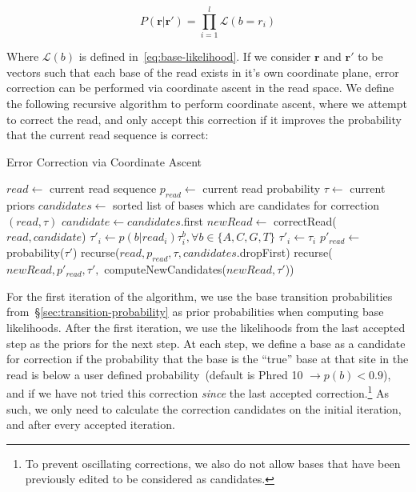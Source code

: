 \documentclass{llncs}
\begin{document}
\begin{equation}
\label{eq:read-probability}
P(\mathbf{r} | \mathbf{r}') = \prod_{i = 1}^l \mathcal{L}(b = r_i)
\end{equation}

Where $\mathcal{L}(b)$ is defined in~\eqref{eq:base-likelihood}. If we consider $\mathbf{r}$ and
$\mathbf{r}'$ to be vectors such that each base of the read exists in it's own coordinate plane, error
correction can be performed via coordinate ascent in the read space. We define the following recursive
algorithm to perform coordinate ascent, where we attempt to correct the read, and only accept this
correction if it improves the probability that the current read sequence is correct:

\begin{algorithm}
\caption{Error Correction via Coordinate Ascent}
\label{alg:ex-coordinate-ascent}
\begin{algorithmic}
\STATE $read \leftarrow$ current read sequence
\STATE $p_{read} \leftarrow$ current read probability
\STATE $\tau \leftarrow$ current priors
\STATE $candidates \leftarrow$ sorted list of bases which are candidates for correction
\RETURN $(read, \tau)$
\ELSE
\STATE $candidate \leftarrow candidates$.first
\STATE $newRead \leftarrow$ correctRead($read, candidate$)
\STATE $\tau'_i \leftarrow p(b | read_i) \tau_i^b, \forall b \in \{A, C, G, T\}$
\ELSE
\STATE $\tau'_i \leftarrow \tau_i$
\ENDIF
\STATE $p'_{read} \leftarrow$ probability($\tau'$)
\RETURN recurse($read, p_{read}, \tau, candidates$.dropFirst)
\ELSE
\RETURN recurse($newRead, p'_{read}, \tau',$ computeNewCandidates($newRead, \tau'$))
\ENDIF
\ENDFOR
\ENDIF
\end{algorithmic}
\end{algorithm}

For the first iteration of the algorithm, we use the base transition probabilities
from~\S\ref{sec:transition-probability} as prior probabilities when computing base likelihoods. After the
first iteration, we use the likelihoods from the last accepted step as the priors for the next step. At each
step, we define a base as a candidate for correction if the probability that the base is the ``true'' base at
that site in the read is below a user defined probability~(default is Phred 10 $\rightarrow p(b) < 0.9$),
and if we have not tried this correction \emph{since} the last accepted correction.\footnote{To prevent
oscillating corrections, we also do not allow bases that have been previously edited to be considered as
candidates.} As such, we only need to calculate the correction candidates on the initial iteration, and
after every accepted iteration.
\end{document}
